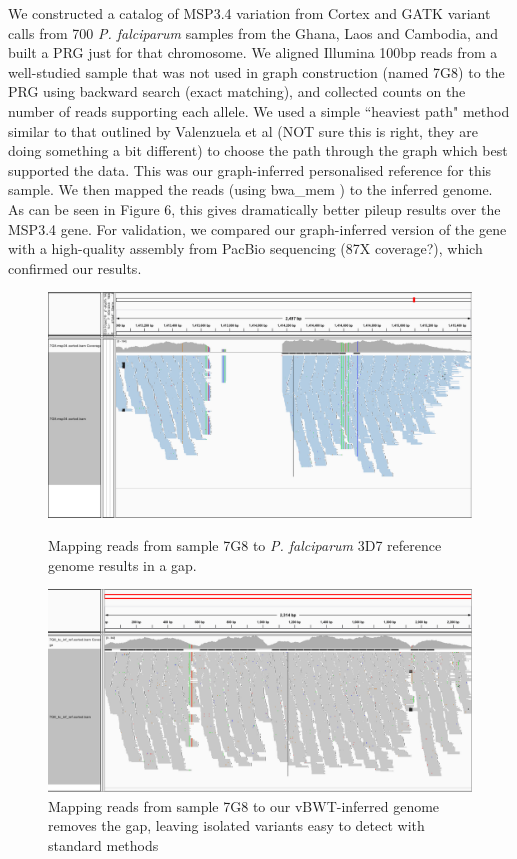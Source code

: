 \documentclass[runningheads,a4paper]{llncs}
\begin{document}
We constructed a catalog of MSP3.4 variation from Cortex \cite{iqbal} and GATK \cite{depristo} variant calls from 700 \textit{P. falciparum} samples from the Ghana, Laos and Cambodia, and built a PRG just for that chromosome. We aligned Illumina 100bp reads from a well-studied sample that was not used in graph construction (named 7G8) to the PRG using backward search (exact matching), and collected counts on the number of reads supporting each allele. We used a simple ``heaviest path" method similar to that outlined by Valenzuela et al \cite{valen} (NOT sure this is right, they are doing something a bit different) to choose the path through the graph which best supported the data. This was our graph-inferred personalised reference for this sample. We then mapped the reads (using bwa\_mem \cite{hengli}) to the inferred genome. As can be seen in Figure 6, this gives dramatically better pileup results over the MSP3.4 gene. For validation, we compared our graph-inferred version of the gene with a high-quality assembly from PacBio sequencing (87X coverage?), which confirmed our results. 


\begin{figure}[!tbp]
  \centering
  \begin{minipage}[b]{0.4\textwidth}
    \includegraphics[width=\textwidth]{7G8_to_3D7_pileup.png}
    \caption{Mapping reads from sample 7G8 to \textit{P. falciparum} 3D7 reference genome results in a gap.}
  \end{minipage}
  \hfill
  \begin{minipage}[b]{0.45\textwidth}
    \includegraphics[width=\textwidth]{7G8_to_inf_ref_pileup.png}
    \caption{Mapping reads from sample 7G8 to our vBWT-inferred genome removes the gap, leaving isolated variants easy to detect with standard methods }
  \end{minipage}
\end{figure}
\end{document}
